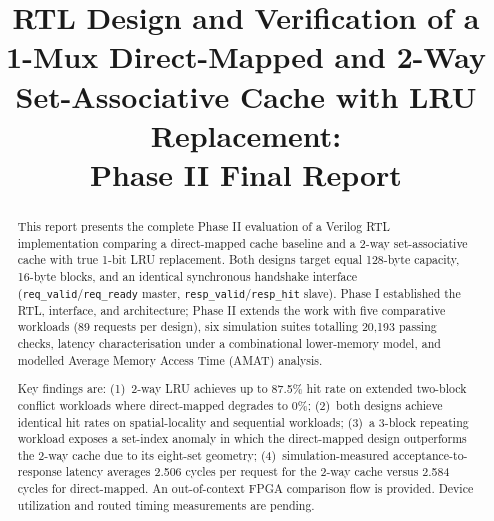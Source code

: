 \documentclass[conference]{IEEEtran}
\begin{document}
\title{RTL Design and Verification of a 1-Mux Direct-Mapped and
       2-Way Set-Associative Cache with LRU Replacement:\\
       Phase II Final Report}

\author{%
  \and
  \and
  \and
  \and
}

\maketitle

\begin{abstract}
This report presents the complete Phase II evaluation of a Verilog RTL
implementation comparing a direct-mapped cache baseline and a 2-way
set-associative cache with true 1-bit LRU replacement.
Both designs target equal 128-byte capacity, 16-byte blocks, and an
identical synchronous handshake interface ({\tt req\_valid}/{\tt req\_ready}
master, {\tt resp\_valid}/{\tt resp\_hit} slave).
Phase I established the RTL, interface, and architecture; Phase II extends
the work with five comparative workloads (89 requests per design),
six simulation suites totalling 20,193 passing checks,
latency characterisation under a combinational lower-memory model, and
modelled Average Memory Access Time (AMAT) analysis.

Key findings are: (1)~2-way LRU achieves up to 87.5\% hit rate on
extended two-block conflict workloads where direct-mapped degrades to 0\%;
(2)~both designs achieve identical hit rates on spatial-locality and
sequential workloads; (3)~a 3-block repeating workload exposes a set-index
anomaly in which the direct-mapped design outperforms the 2-way cache due
to its eight-set geometry; (4)~simulation-measured acceptance-to-response
latency averages 2.506 cycles per request for the 2-way cache versus
2.584 cycles for direct-mapped.
An out-of-context FPGA comparison flow is provided. Device utilization
and routed timing measurements are pending.
\end{abstract}
\end{document}
